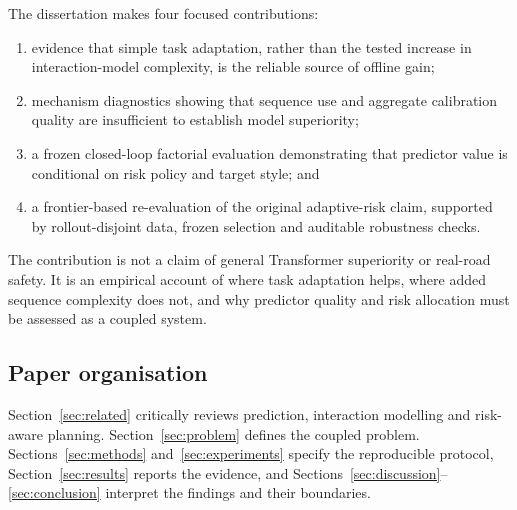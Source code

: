 The dissertation makes four focused contributions:

\begin{enumerate}
  \item evidence that simple task adaptation, rather than the tested increase
  in interaction-model complexity, is the reliable source of offline gain;
  \item mechanism diagnostics showing that sequence use and aggregate
  calibration quality are insufficient to establish model superiority;
  \item a frozen closed-loop factorial evaluation demonstrating that predictor
  value is conditional on risk policy and target style; and
  \item a frontier-based re-evaluation of the original adaptive-risk claim,
  supported by rollout-disjoint data, frozen selection and auditable
  robustness checks.
\end{enumerate}

The contribution is not a claim of general Transformer superiority or
real-road safety. It is an empirical account of where task adaptation helps,
where added sequence complexity does not, and why predictor quality and risk
allocation must be assessed as a coupled system.

\subsection{Paper organisation}

Section~\ref{sec:related} critically reviews prediction, interaction modelling
and risk-aware planning. Section~\ref{sec:problem} defines the coupled problem.
Sections~\ref{sec:methods} and~\ref{sec:experiments} specify the reproducible
protocol, Section~\ref{sec:results} reports the evidence, and
Sections~\ref{sec:discussion}--\ref{sec:conclusion} interpret the findings and
their boundaries.
